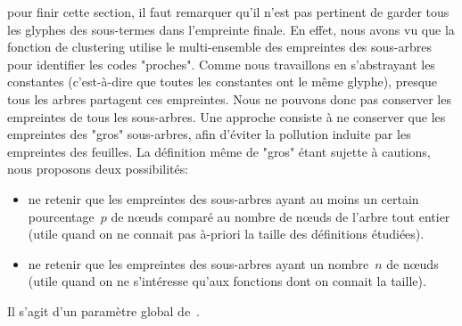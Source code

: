 pour finir cette section, il faut remarquer qu'il n'est pas pertinent
de garder tous les glyphes des sous-termes dans l'empreinte finale.
En effet, nous avons vu que la fonction de clustering utilise le
multi-ensemble des empreintes des sous-arbres pour identifier les
codes "proches". Comme nous travaillons en s'abstrayant les constantes
(c'est-à-dire que toutes les constantes ont le même glyphe), presque
tous les arbres partagent ces empreintes. Nous ne pouvons donc pas
conserver les empreintes de tous les sous-arbres.
%
Une approche consiste à ne conserver que les empreintes des "gros"
sous-arbres, afin d'éviter la pollution induite par les empreintes des
feuilles. La définition même de "gros" étant sujette à cautions, nous proposons deux possibilités:
\begin{itemize}
\item ne retenir que les empreintes des
sous-arbres ayant au moins un certain pourcentage~$p$ de nœuds comparé au nombre de nœuds de l'arbre tout entier (utile quand on ne connait pas à-priori la taille des définitions étudiées).
\item ne retenir que les empreintes des
sous-arbres ayant un nombre~$n$ de nœuds (utile quand on ne s'intéresse qu'aux fonctions dont on connait la taille).
\end{itemize}

Il s'agit d'un paramètre global de~{\Asak}.
